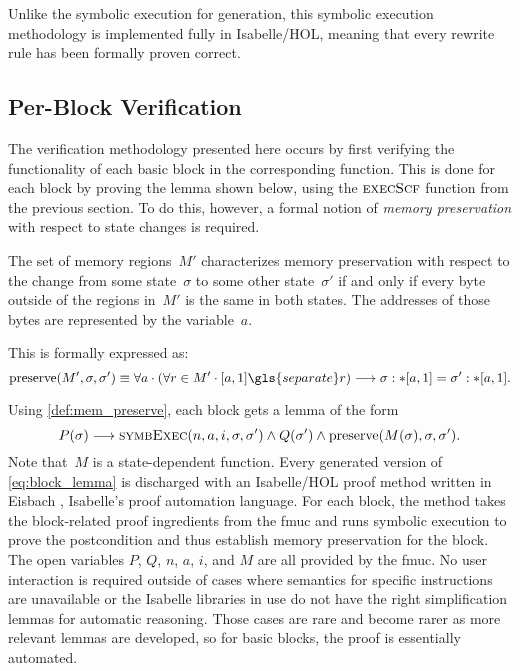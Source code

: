 Unlike the symbolic execution for generation,
this symbolic execution methodology is implemented fully in Isabelle/HOL,
meaning that every rewrite rule has been formally proven correct.

\subsection{Per-Block Verification}\label{sse:per-block}
The verification methodology presented here occurs
by first verifying the functionality of each basic block in the corresponding function.
This is done for each block by proving the lemma shown below,
using the $\operatorname{\textsc{execScf}}$ function from the previous section.
To do this, however, a formal notion of \emph{memory preservation}
with respect to state changes is required.
\begin{definition}\label{def:mem_preserve}
  The set of memory regions~$M'$ characterizes memory preservation with respect to
  the change from some state~$\sigma$ to some other state~$\sigma'$
  if and only if every byte outside of the regions in~$M'$ is the same in both states.
  The addresses of those bytes are represented by the variable~$a$.

  This is formally expressed as:
  \begin{equation}
    \usage(M',\sigma,\sigma')\equiv\forall a\cdot(\forall r\in M'\cdot\region{a}1\gls{separate}r)
    \longrightarrow\readmemS{\sigma}a{1}=\readmemS{\sigma'}a{1}.
  \end{equation}
\end{definition}

Using \cref{def:mem_preserve}, each block gets a lemma of the form
\begin{equation}
  P(\sigma)\longrightarrow\operatorname{\textsc{symbExec}}(n,a,i,\sigma,\sigma')\wedge
  Q(\sigma')\wedge\operatorname{preserve}(M(\sigma),\sigma,\sigma').\label{eq:block_lemma}
\end{equation}
Note that~$M$ is a state-dependent function.
Every generated version of \cref{eq:block_lemma} is discharged
with an Isabelle/HOL proof method written in Eisbach \autocite{matichuk2016eisbach},
Isabelle's proof automation language.
For each block, the method takes the block-related proof ingredients
from the \ac{fmuc} and runs symbolic execution
to prove the postcondition and thus establish memory preservation for the block.
The open variables $P$, $Q$, $n$, $a$, $i$, and $M$ are all provided by the \ac{fmuc}.
No user interaction is required outside of cases where semantics
for specific instructions are unavailable or the Isabelle libraries in use
do not have the right simplification lemmas for automatic reasoning.
Those cases are rare and become rarer as more relevant lemmas are developed,
so for basic blocks, the proof is essentially automated.

